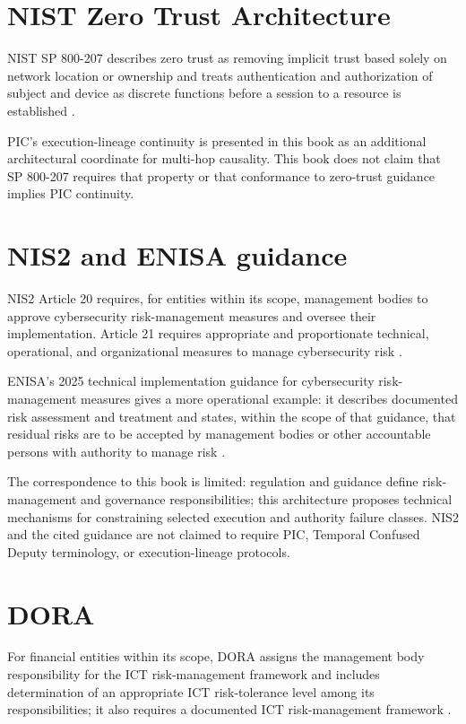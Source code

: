 \documentclass[10pt,oneside,openany]{book}
\begin{document}
\section{NIST Zero Trust Architecture}
NIST SP 800-207 describes zero trust as removing implicit trust based solely on network location or ownership and treats authentication and authorization of subject and device as discrete functions before a session to a resource is established \cite{nistzta2020}.

PIC's execution-lineage continuity is presented in this book as an additional architectural coordinate for multi-hop causality. This book does not claim that SP 800-207 requires that property or that conformance to zero-trust guidance implies PIC continuity.

\section{NIS2 and ENISA guidance}
NIS2 Article 20 requires, for entities within its scope, management bodies to approve cybersecurity risk-management measures and oversee their implementation. Article 21 requires appropriate and proportionate technical, operational, and organizational measures to manage cybersecurity risk \cite{nis22022}.

ENISA's 2025 technical implementation guidance for cybersecurity risk-management measures gives a more operational example: it describes documented risk assessment and treatment and states, within the scope of that guidance, that residual risks are to be accepted by management bodies or other accountable persons with authority to manage risk \cite{enisa2025risk}.

The correspondence to this book is limited: regulation and guidance define risk-management and governance responsibilities; this architecture proposes technical mechanisms for constraining selected execution and authority failure classes. NIS2 and the cited guidance are not claimed to require PIC, Temporal Confused Deputy terminology, or execution-lineage protocols.

\section{DORA}
For financial entities within its scope, DORA assigns the management body responsibility for the ICT risk-management framework and includes determination of an appropriate ICT risk-tolerance level among its responsibilities; it also requires a documented ICT risk-management framework \cite{dora2022}.
\end{document}
